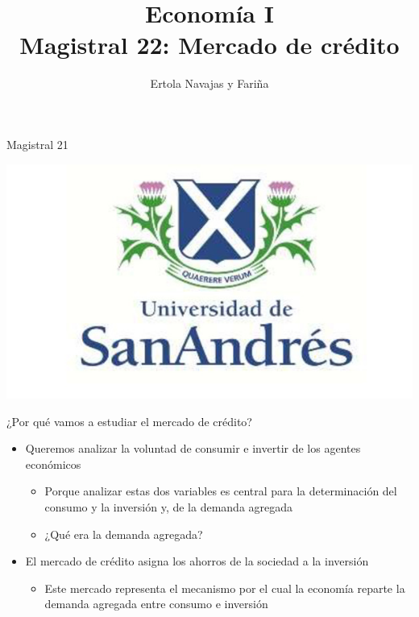 \documentclass{beamer}
\title[Economía I]{Economía I \vspace{4mm}
\\ Magistral 22: Mercado de crédito}
\date{}
\author[Ertola Navajas y Fariña]{Ertola Navajas y Fariña}
\institute[]{Universidad de San Andrés}
\begin{document}
\begin{frame}
\titlepage
\centering
Magistral 21

\includegraphics[scale=0.2]{Slides Principios de Economia/Figures/logoUDESA.jpg} 
\end{frame}

\begin{frame}{¿Por qué vamos a estudiar el mercado de crédito?}
    \begin{itemize}
        \item Queremos analizar la voluntad de consumir e invertir de los agentes económicos \vspace{1mm}
        \begin{itemize}
            \item Porque analizar estas dos variables es central para la determinación del consumo y la inversión y, de la demanda agregada
            \item ¿Qué era la demanda agregada? 
        \end{itemize}
        \vspace{3mm}
        \item El mercado de crédito asigna los ahorros de la sociedad a la inversión \vspace{1mm}
        \begin{itemize}
            \item Este mercado representa el mecanismo por el cual la economía reparte la demanda agregada entre consumo e inversión
        \end{itemize}
    \end{itemize}
\end{frame}
\end{document}
